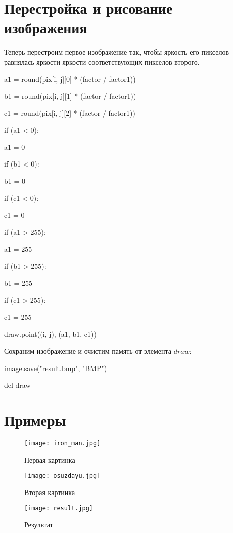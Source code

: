 \documentclass{article}
\newcommand\tab[1][1cm]{\hspace*{#1}}
\begin{document}
\newpage
\section{Перестройка и рисование изображения}
Теперь перестроим первое изображение так, чтобы яркость его пикселов равнялась яркости яркости соответствующих пикселов второго. 

{

a1 = round(pix[i, j][0] * (factor / factor1))

b1 = round(pix[i, j][1] * (factor / factor1))

c1 = round(pix[i, j][2] * (factor / factor1))

if (a1 < 0):

\tab[1cm]		a1 = 0

if (b1 < 0):

\tab[1cm]		b1 = 0

if (c1 < 0):

\tab[1cm]		c1 = 0

if (a1 > 255):

\tab[1cm]		a1 = 255

if (b1 > 255):

\tab[1cm]		b1 = 255

if (c1 > 255):

\tab[1cm]		c1 = 255

draw.point((i, j), (a1, b1, c1))}
\vspace{1em}


Сохраним изображение и очистим память от элемента $draw$:
\vspace{1em}
	
{

image.save("result.bmp", "BMP")

del draw
 }
 
\section{Примеры}
\begin{figure}[h]
\centering
\texttt{[image: iron\_man.jpg]}
\caption{Первая картинка}
\label{fig:mpr}
\end{figure}

\begin{figure}[h]
\centering
\texttt{[image: osuzdayu.jpg]}
\caption{Вторая картинка}
\label{fig:mpr}
\end{figure}

\begin{figure}[h]
\centering
\texttt{[image: result.jpg]}
\caption{Результат}
\label{fig:mpr}
\end{figure}
  
\end{document}
